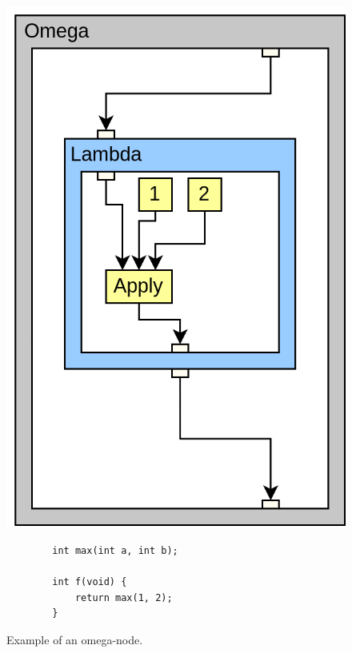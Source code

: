 \begin{figure}[H]
    \centering
    \includegraphics[width=\textwidth/5]{Images/omega-node-example.png}
    \begin{verbatim}
        int max(int a, int b);

        int f(void) {
            return max(1, 2);
        }
    \end{verbatim}
    \caption{Example of an omega-node.}
    \label{fig:RVSDG_omega_node}
\end{figure}
